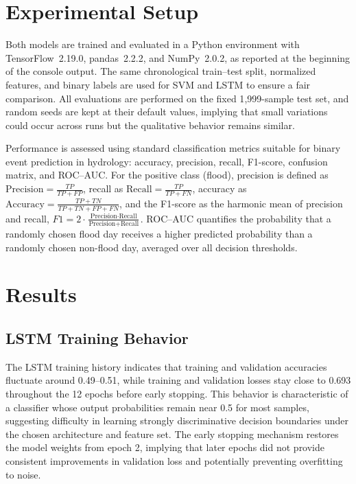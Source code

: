 \documentclass[conference]{IEEEtran}
\begin{document}
\section{Experimental Setup}
Both models are trained and evaluated in a Python environment with TensorFlow~2.19.0, pandas~2.2.2, and NumPy~2.0.2, as reported at the beginning of the console output. The same chronological train--test split, normalized features, and binary labels are used for SVM and LSTM to ensure a fair comparison. All evaluations are performed on the fixed 1{,}999-sample test set, and random seeds are kept at their default values, implying that small variations could occur across runs but the qualitative behavior remains similar. 

Performance is assessed using standard classification metrics suitable for binary event prediction in hydrology: accuracy, precision, recall, F1-score, confusion matrix, and ROC--AUC. For the positive class (flood), precision is defined as \(\text{Precision} = \frac{TP}{TP+FP}\), recall as \(\text{Recall} = \frac{TP}{TP+FN}\), accuracy as \(\text{Accuracy} = \frac{TP+TN}{TP+TN+FP+FN}\), and the F1-score as the harmonic mean of precision and recall, \(F1 = 2\cdot\frac{\text{Precision} \cdot \text{Recall}}{\text{Precision}+\text{Recall}}\). ROC--AUC quantifies the probability that a randomly chosen flood day receives a higher predicted probability than a randomly chosen non-flood day, averaged over all decision thresholds. 

\section{Results}
\subsection{LSTM Training Behavior}
The LSTM training history indicates that training and validation accuracies fluctuate around 0.49--0.51, while training and validation losses stay close to 0.693 throughout the 12 epochs before early stopping. This behavior is characteristic of a classifier whose output probabilities remain near 0.5 for most samples, suggesting difficulty in learning strongly discriminative decision boundaries under the chosen architecture and feature set. The early stopping mechanism restores the model weights from epoch 2, implying that later epochs did not provide consistent improvements in validation loss and potentially preventing overfitting to noise. 

\end{document}
